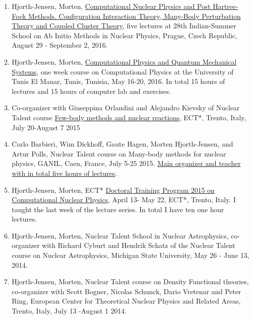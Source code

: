 \documentclass[%
oneside,                 %
final,                   %
10pt]{article}
\begin{document}
\begin{enumerate}
\item Hjorth-Jensen, Morten, \href{{http://rafael.ujf.cas.cz/school}}{Computational Nuclear Physics and Post Hartree-Fock Methods. Configuration Interaction Theory, Many-Body Perturbation Theory and Coupled Cluster Theory}, five lectures at 28th Indian-Summer School on Ab Initio Methods in Nuclear Physics, Prague, Czech Republic, August 29 - September 2, 2016.

\item Hjorth-Jensen, Morten, \href{{http://compphysics.github.io/CompPhysUTunis/doc/web/course.html}}{Computational Physics and Quantum Mechanical Systems}, one week course on Computational Physics at the University of Tunis El Manar, Tunis, Tunisia, May 16-20, 2016. In total 15 hours of lectures and 15 hours of computer lab and exercises. 

\item Co-organizer with Giuseppina Orlandini and Alejandro Kievsky of Nuclear Talent course \href{{https://groups.nscl.msu.edu/jina/talent/wiki/Course_3}}{Few-body methods and nuclear reactions}, ECT*, Trento, Italy, July 20-August 7 2015

\item Carlo Barbieri, Wim Dickhoff, Gaute Hagen, Morten Hjorth-Jensen, and Artur Polls, Nuclear Talent course on Many-body methods for nuclear physics, GANIL, Caen, France, July 5-25 2015. \href{{http://nucleartalent.github.io/Course2ManyBodyMethods/doc/web/course.html}}{Main organizer and teacher with in total five hours of lectures}. 

\item Hjorth-Jensen, Morten, ECT* \href{{http://www.ectstar.eu/node/1287}}{Doctoral Training Program 2015 on Computational Nuclear Physics}, April 13- May 22, ECT*, Trento, Italy. I taught the last week of the lecture series. In total I have ten one hour lectures. 

\item Hjorth-Jensen, Morten, Nuclear Talent School in Nuclear Astrophysics, co-organizer with Richard Cyburt and Hendrik Schatz of the Nuclear Talent course on Nuclear Astrophysics,  Michigan State University, May 26 - June 13, 2014. 

\item Hjorth-Jensen, Morten, Nuclear Talent course on Density Functional theories, co-organizer with Scott Bogner, Nicolas Schunck, Dario Vretenar and Peter Ring, European Center for Theoretical Nuclear Physics and Related Areas, Trento, Italy, July 13 -August 1 2014.


\end{enumerate}
\end{document}
